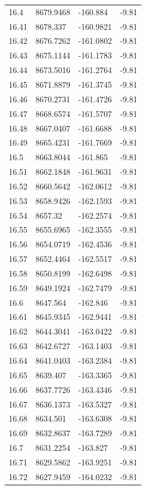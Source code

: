\begin{table}[H]
\begin{tabular}{llll}
16.4 & 8679.9468 & -160.884 & -9.81 \\
16.41 & 8678.337 & -160.9821 & -9.81 \\
16.42 & 8676.7262 & -161.0802 & -9.81 \\
16.43 & 8675.1144 & -161.1783 & -9.81 \\
16.44 & 8673.5016 & -161.2764 & -9.81 \\
16.45 & 8671.8879 & -161.3745 & -9.81 \\
16.46 & 8670.2731 & -161.4726 & -9.81 \\
16.47 & 8668.6574 & -161.5707 & -9.81 \\
16.48 & 8667.0407 & -161.6688 & -9.81 \\
16.49 & 8665.4231 & -161.7669 & -9.81 \\
16.5 & 8663.8044 & -161.865 & -9.81 \\
16.51 & 8662.1848 & -161.9631 & -9.81 \\
16.52 & 8660.5642 & -162.0612 & -9.81 \\
16.53 & 8658.9426 & -162.1593 & -9.81 \\
16.54 & 8657.32 & -162.2574 & -9.81 \\
16.55 & 8655.6965 & -162.3555 & -9.81 \\
16.56 & 8654.0719 & -162.4536 & -9.81 \\
16.57 & 8652.4464 & -162.5517 & -9.81 \\
16.58 & 8650.8199 & -162.6498 & -9.81 \\
16.59 & 8649.1924 & -162.7479 & -9.81 \\
16.6 & 8647.564 & -162.846 & -9.81 \\
16.61 & 8645.9345 & -162.9441 & -9.81 \\
16.62 & 8644.3041 & -163.0422 & -9.81 \\
16.63 & 8642.6727 & -163.1403 & -9.81 \\
16.64 & 8641.0403 & -163.2384 & -9.81 \\
16.65 & 8639.407 & -163.3365 & -9.81 \\
16.66 & 8637.7726 & -163.4346 & -9.81 \\
16.67 & 8636.1373 & -163.5327 & -9.81 \\
16.68 & 8634.501 & -163.6308 & -9.81 \\
16.69 & 8632.8637 & -163.7289 & -9.81 \\
16.7 & 8631.2254 & -163.827 & -9.81 \\
16.71 & 8629.5862 & -163.9251 & -9.81 \\
16.72 & 8627.9459 & -164.0232 & -9.81 \\

\end{tabular}
\end{table}
